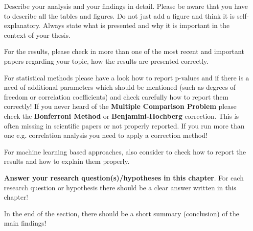 Describe your analysis and your findings in detail. Please be aware that you have to describe all the tables and figures. Do not just add a figure and think it is self-explanatory. Always state what is presented and why it is important in the context of your thesis. 

For the results, please check in more than one of the most recent and important papers regarding your topic, how the results are presented correctly. 

For statistical methods please have a look how to report p-values and if there is a need of additional parameters which should be mentioned (such as degrees of freedom or correlation coefficients) and check carefully how to report them correctly! If you never heard of the \textbf{Multiple Comparison Problem} please check the \textbf{Bonferroni Method} or \textbf{Benjamini-Hochberg} correction. This is often missing in scientific papers or not properly reported. If you run more than one e.g. correlation analysis you need to apply a correction method! 

For machine learning based approaches, also consider to check how to report the results and how to explain them properly. 

\textbf{Answer your research question(s)/hypotheses in this chapter}. For each research question or hypothesis there should be a clear answer written in this chapter! 

In the end of the section, there should be a short summary (conclusion) of the main findings! 